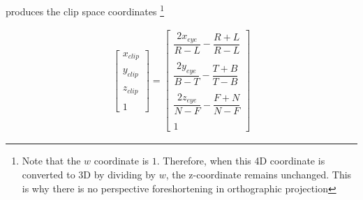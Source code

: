 \documentclass{article}
\begin{document}
    \noindent produces the clip space coordinates \footnote{Note that the $w$ coordinate is $1$. Therefore, when this 4D coordinate is converted to 3D by dividing by $w$, the z-coordinate remains unchanged. This is why there is no perspective foreshortening in orthographic projection} 


    \begin{align}
        \begin{bmatrix} x_{clip} \\ \\ y_{clip} \\ \\ z_{clip} \\ \\ 1 \end{bmatrix} = 
        \begin{bmatrix} \dfrac{2x_{eye}}{R-L} - \dfrac{R+L}{R-L} \\ \\ \dfrac{2y_{eye}}{B-T} - \dfrac{T+B}{T-B} \\ \\ \dfrac{2z_{eye}}{N-F} - \dfrac{F+N}{N-F} \\ \\ 1 \end{bmatrix}
    \end{align}

    

    \noindent 
    
\end{document}
